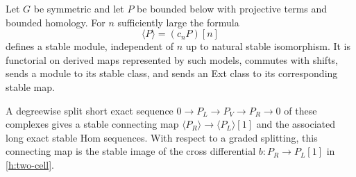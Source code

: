 \begin{lemma}\label{h:stable-image}
Let $G$ be symmetric and let $P$ be bounded below with projective terms and
bounded homology. For $n$ sufficiently large the formula
\begin{equation}\label{h:stable-image-formula}
 \langle P\rangle=(c_nP)[n]
\end{equation}
defines a stable module, independent of $n$ up to natural stable
isomorphism. It is functorial on derived maps represented by such models,
commutes with shifts, sends a module to its stable class, and sends an Ext
class to its corresponding stable map.

A degreewise split short exact sequence $0\to P_L\to P_V\to P_R\to0$
of these complexes gives a stable connecting map
$\langle P_R\rangle\to\langle P_L\rangle[1]$ and the associated long exact
stable Hom sequences. With respect to a graded splitting, this connecting
map is the stable image of the cross differential
$b:P_R\to P_L[1]$ in \eqref{h:two-cell}.
\end{lemma}

